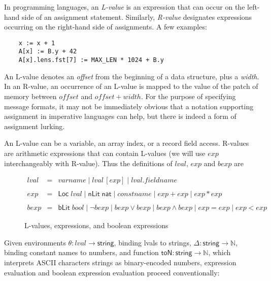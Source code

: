 \documentclass[svgnames]{llncs}
\newcommand{\konst}[1]{\ensuremath{\mathsf{#1}}}
\begin{document}
In programming languages, an \emph{L-value} is an expression that can
occur on the left-hand side of an assignment statement. Similarly,
\emph{R-value} designates expressions occurring on the right-hand side
of assignments. A few examples:

\begin{verbatim}
    x := x + 1
    A[x] := B.y + 42
    A[x].lens.fst[7] := MAX_LEN * 1024 + B.y
\end{verbatim}

An L-value denotes an \emph{offset} from the beginning of a
data structure, plus a \emph{width}. In an R-value, an occurrence of an
L-value is mapped to the value of the patch of memory between
$\mathit{offset}$ and $\mathit{offset} + \mathit{width}$. For the
purpose of specifying message formats, it may not be immediately
obvious that a notation supporting assignment in imperative languages
can help, but there is indeed a form of assignment lurking.

An L-value can be a variable, an array index, or a record field
access. R-values are arithmetic expressions that can contain L-values
(we will use $\mathit{exp}$ interchangeably with R-value). Thus the
definitions of $\mathit{lval}$, $\mathit{exp}$ and $\mathit{bexp}$ are

\begin{figure}
\[
\begin{array}{rcl}
\mathit{lval} & = & \mathit{varname} \mid
                    \mathit{lval} \, [ \mathit{exp} ] \mid
                    \mathit{lval} . \mathit{fieldname} \\
  & & \\
\mathit{exp} & = & \konst{Loc}\; \mathit{lval}
              \mid \konst{nLit}\; \konst{nat}
              \mid \mathit{constname}
              \mid \mathit{exp} + \mathit{exp}
              \mid \mathit{exp} * \mathit{exp} \\
  & & \\
\mathit{bexp} & = & \konst{bLit}\; bool
              \mid  \neg \mathit{bexp}
              \mid  \mathit{bexp} \lor \mathit{bexp}
              \mid  \mathit{bexp} \land \mathit{bexp}
              \mid  \mathit{exp} = \mathit{exp}
              \mid  \mathit{exp} < \mathit{exp}
\end{array}
\]
\caption{L-values, expressions, and boolean expressions}
\end{figure}

Given environments $\theta: \mathit{lval} \to \konst{string}$, binding
lvals to strings, $\Delta : \konst{string} \to \mathbb{N}$, binding
constant names to numbers, and function
$\konst{toN}:\konst{string}\to\mathbb{N}$, which interprets ASCII
characters strings as binary-encoded numbers, expression evaluation
and boolean expression evaluation proceed conventionally:
\end{document}
